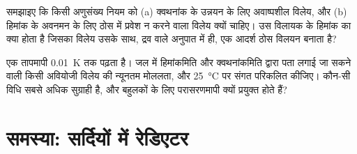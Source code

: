 \begin{exercise}[$\star\star\star$]\label{exo:b2:chemical-potential:11}
समझाइए कि किसी अणुसंख्य नियम को (a) क्वथनांक के उन्नयन के लिए अवाष्पशील
विलेय, और (b) हिमांक के अवनमन के लिए ठोस में प्रवेश न करने वाला विलेय
क्यों चाहिए। उस विलायक के हिमांक का क्या होता है
जिसका विलेय उसके साथ, द्रव वाले अनुपात में ही, एक आदर्श ठोस विलयन
बनाता है?
\end{exercise}

\begin{exercise}[$\star\star\star$]\label{exo:b2:chemical-potential:12}
एक तापमापी \qty{0.01}{K} तक पढ़ता है। जल में हिमांकमिति और
क्वथनांकमिति द्वारा पता लगाई जा सकने वाली किसी अवियोजी विलेय की
न्यूनतम मोललता, और \qty{25}{\celsius} पर संगत  परिकलित कीजिए।
कौन-सी विधि सबसे अधिक सुग्राही है, और बहुलकों के लिए परासरणमापी क्यों प्रयुक्त होते हैं?
\end{exercise}

\section{समस्या: सर्दियों में रेडिएटर}

